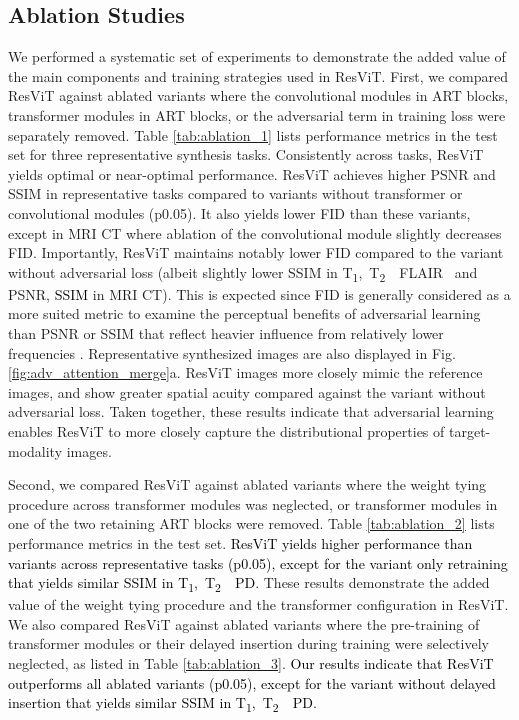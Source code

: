 \documentclass[journal,twoside,web]{ieeecolor}
\newcommand{\ToneTtwoPD}{T\textsubscript{1},~T\textsubscript{2}~~PD}
\newcommand{\ToneTtwoFlair}{T\textsubscript{1},~T\textsubscript{2}~~FLAIR}
\newcommand*{\revhl}{\textcolor{black}}
\begin{document}
\subsection{Ablation Studies}
We performed a systematic set of experiments to demonstrate the added value of the main components and training strategies used in ResViT. First, we compared ResViT against ablated variants where the convolutional modules in ART blocks, transformer modules in ART blocks, or the adversarial term in training loss were separately removed. Table \ref{tab:ablation_1} lists performance metrics in the test set for three representative synthesis tasks. Consistently across tasks, ResViT yields optimal or near-optimal performance. ResViT achieves higher PSNR and SSIM in representative tasks compared to variants without transformer or convolutional modules (p0.05). It also yields lower FID than these variants, except in MRI  CT where ablation of the convolutional module slightly decreases FID. Importantly, ResViT maintains notably lower FID compared to the variant without adversarial loss (albeit slightly lower SSIM in \ToneTtwoFlair~ and PSNR, \revhl{SSIM} in MRI  CT). This is expected since FID is generally considered as a more suited metric to examine the perceptual benefits of adversarial learning than PSNR or SSIM that reflect heavier influence from relatively lower frequencies \cite{fid}. Representative synthesized images are also displayed in Fig. \ref{fig:adv_attention_merge}a. ResViT images more closely mimic the reference images, and show greater spatial acuity compared against the variant without adversarial loss. Taken together, these results indicate that adversarial learning enables ResViT to more closely capture the distributional properties of target-modality images.


Second, we compared ResViT against ablated variants where the weight tying procedure across transformer modules was neglected, or transformer modules in one of the two retaining ART blocks were removed. Table \ref{tab:ablation_2} lists performance metrics in the test set. \revhl{ResViT yields higher performance than variants across representative tasks (p0.05), except for the variant only retraining  that yields similar SSIM in \ToneTtwoPD}. These results demonstrate the added value of the weight tying procedure and the transformer configuration in ResViT. We also compared ResViT against ablated variants where the pre-training of transformer modules or their delayed insertion during training were selectively neglected, as listed in Table \ref{tab:ablation_3}. \revhl{Our results indicate that ResViT outperforms all ablated variants (p0.05), except for the variant without delayed insertion that yields similar SSIM in \ToneTtwoPD}.
\end{document}
